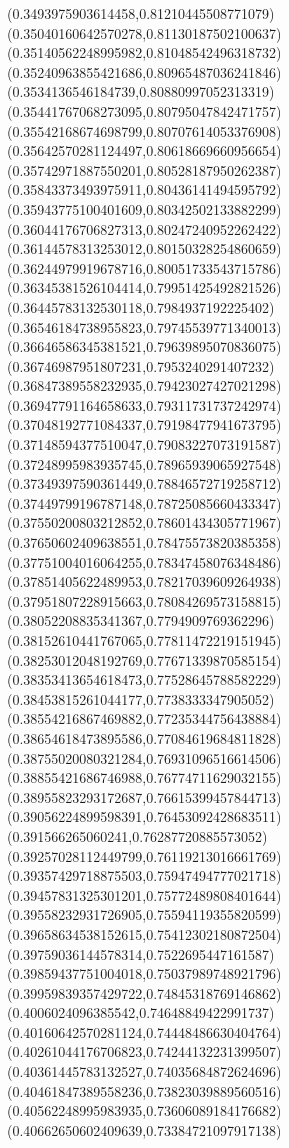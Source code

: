 \documentclass[12pt]{article}
\theoremstyle{plain}
\theoremstyle{definition}
\theoremstyle{remark}
\begin{document}
\begin{figure}
{  (0.3493975903614458,0.81210445508771079)%
  (0.35040160642570278,0.81130187502100637)%
  (0.35140562248995982,0.81048542496318732)%
  (0.35240963855421686,0.80965487036241846)%
  (0.3534136546184739,0.80880997052313319)%
  (0.35441767068273095,0.80795047842471757)%
  (0.35542168674698799,0.80707614053376908)%
  (0.35642570281124497,0.80618669660956654)%
  (0.35742971887550201,0.80528187950262387)%
  (0.35843373493975911,0.80436141494595792)%
  (0.35943775100401609,0.80342502133882299)%
  (0.36044176706827313,0.80247240952262422)%
  (0.36144578313253012,0.80150328254860659)%
  (0.36244979919678716,0.80051733543715786)%
  (0.36345381526104414,0.79951425492821526)%
  (0.36445783132530118,0.7984937192225402)%
  (0.36546184738955823,0.79745539771340013)%
  (0.36646586345381521,0.79639895070836075)%
  (0.36746987951807231,0.7953240291407232)%
  (0.36847389558232935,0.79423027427021298)%
  (0.36947791164658633,0.79311731737242974)%
  (0.37048192771084337,0.79198477941673795)%
  (0.37148594377510047,0.79083227073191587)%
  (0.37248995983935745,0.78965939065927548)%
  (0.37349397590361449,0.78846572719258712)%
  (0.37449799196787148,0.78725085660433347)%
  (0.37550200803212852,0.78601434305771967)%
  (0.37650602409638551,0.78475573820385358)%
  (0.37751004016064255,0.78347458076348486)%
  (0.37851405622489953,0.78217039609264938)%
  (0.37951807228915663,0.78084269573158815)%
  (0.38052208835341367,0.7794909769362296)%
  (0.38152610441767065,0.77811472219151945)%
  (0.38253012048192769,0.77671339870585154)%
  (0.38353413654618473,0.77528645788582229)%
  (0.38453815261044177,0.7738333347905052)%
  (0.38554216867469882,0.77235344756438884)%
  (0.38654618473895586,0.77084619684811828)%
  (0.38755020080321284,0.76931096516614506)%
  (0.38855421686746988,0.76774711629032155)%
  (0.38955823293172687,0.76615399457844713)%
  (0.39056224899598391,0.76453092428683511)%
  (0.391566265060241,0.76287720885573052)%
  (0.39257028112449799,0.76119213016661769)%
  (0.39357429718875503,0.75947494777021718)%
  (0.39457831325301201,0.75772489808401644)%
  (0.39558232931726905,0.75594119355820599)%
  (0.39658634538152615,0.75412302180872504)%
  (0.39759036144578314,0.7522695447161587)%
  (0.39859437751004018,0.75037989748921796)%
  (0.39959839357429722,0.74845318769146862)%
  (0.4006024096385542,0.74648849422991737)%
  (0.40160642570281124,0.74448486630404764)%
  (0.40261044176706823,0.74244132231399507)%
  (0.40361445783132527,0.74035684872624696)%
  (0.40461847389558236,0.73823039889560516)%
  (0.40562248995983935,0.73606089184176682)%
  (0.40662650602409639,0.73384721097917138)%
}
\end{figure}
\end{document}
